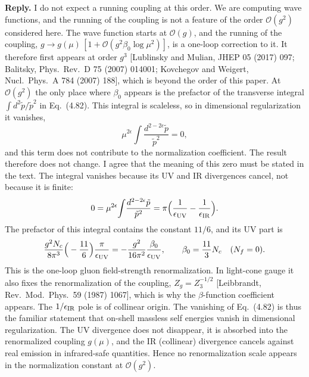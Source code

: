 \documentclass[11pt,a4paper]{article}
\newcommand{\reply}{\noindent\textbf{Reply.} }
\begin{document}
\reply I do not expect a running coupling at this order. We are computing wave functions, and the running of the coupling is not a feature of the order $\mathcal{O}(g^{2})$ considered here. The wave function starts at $\mathcal{O}(g)$, and the running of the coupling, $g\to g(\mu)\,[1+\mathcal{O}(g^{2}\beta_{0}\log\mu^{2})]$, is a one-loop correction to it. It therefore first appears at order $g^{3}$ [Lublinsky and Mulian, JHEP 05 (2017) 097; Balitsky, Phys.\ Rev.\ D 75 (2007) 014001; Kovchegov and Weigert, Nucl.\ Phys.\ A 784 (2007) 188], which is beyond the order of this paper. At $\mathcal{O}(g^{2})$ the only place where $\beta_{0}$ appears is the prefactor of the transverse integral $\int d^{2}\tilde p/\tilde p^{2}$ in Eq.~(4.82). This integral is scaleless, so in dimensional regularization it vanishes,
\begin{equation*}
\mu^{2\epsilon}\!\int\!\frac{d^{2-2\epsilon}\tilde p}{\tilde p^{2}}=0 ,
\end{equation*}
and this term does not contribute to the normalization coefficient. The result therefore does not change. I agree that the meaning of this zero must be stated in the text. The integral vanishes because its UV and IR divergences cancel, not because it is finite:
\begin{equation*}
0=\mu^{2\epsilon}\!\int\!\frac{d^{2-2\epsilon}\tilde p}{\tilde p^{2}}=\pi\Big(\frac{1}{\epsilon_{\rm UV}}-\frac{1}{\epsilon_{\rm IR}}\Big).
\end{equation*}
The prefactor of this integral contains the constant $11/6$, and its UV part is
\begin{equation*}
\frac{g^{2}N_{c}}{8\pi^{3}}\Big(-\frac{11}{6}\Big)\frac{\pi}{\epsilon_{\rm UV}}=-\frac{g^{2}}{16\pi^{2}}\frac{\beta_{0}}{\epsilon_{\rm UV}},\qquad \beta_{0}=\frac{11}{3}N_{c}\quad(N_{f}=0).
\end{equation*}
This is the one-loop gluon field-strength renormalization. In light-cone gauge it also fixes the renormalization of the coupling, $Z_{g}=Z_{3}^{-1/2}$ [Leibbrandt, Rev.\ Mod.\ Phys.\ 59 (1987) 1067], which is why the $\beta$-function coefficient appears. The $1/\epsilon_{\rm IR}$ pole is of collinear origin. The vanishing of Eq.~(4.82) is thus the familiar statement that on-shell massless self energies vanish in dimensional regularization. The UV divergence does not disappear, it is absorbed into the renormalized coupling $g(\mu)$, and the IR (collinear) divergence cancels against real emission in infrared-safe quantities. Hence no renormalization scale appears in the normalization constant at $\mathcal{O}(g^{2})$.
\end{document}
